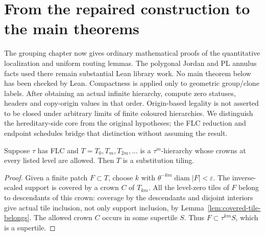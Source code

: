 \section{From the repaired construction to the main theorems}

The grouping chapter now gives ordinary mathematical proofs of the
quantitative localization and uniform routing lemmas. The polygonal Jordan
and PL annulus facts used there remain substantial Lean library work.
No main theorem below has been checked by Lean. Compactness is applied only
to geometric group/clone labels. After obtaining an actual infinite
hierarchy, compute zero statuses, headers and copy-origin values in that
order. Origin-based legality is not asserted to be closed under arbitrary
limits of finite coloured hierarchies. We distinguish the
hereditary-side core from the original hypotheses; the FLC reduction and
endpoint schedules bridge that distinction without assuming the result.

\begin{lemma}
\label{lem:allowed-hierarchy}
Suppose $\tau$ has FLC and $T=T_0,T_m,T_{2m},\ldots$ is a $\tau^m$-hierarchy
whose crowns at every listed level are allowed. Then $T$ is a substitution
tiling.
\end{lemma}
\begin{proof}
Given a finite patch $F\subset T$, choose $k$ with
$\theta^{-km}\operatorname{diam}|F|<\varepsilon$.
The inverse-scaled support is covered by a crown $C$ of $T_{km}$.
All the level-zero tiles of $F$ belong to descendants of this crown:
coverage by the descendants and disjoint interiors give actual tile
inclusion, not only support inclusion, by
Lemma~\ref{lem:covered-tile-belongs}. The allowed crown $C$ occurs in
some supertile $S$. Thus $F\subset\tau^{km}S$, which is a supertile.
\end{proof}

